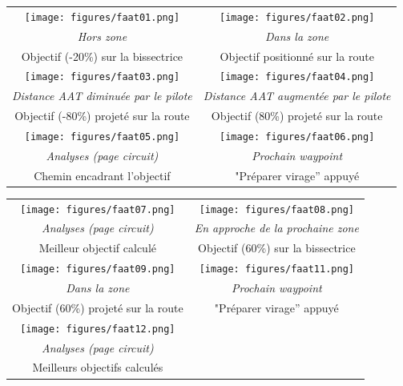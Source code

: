 \begin{maxipage}
\begin{center}
\begin{longtable}{|c|c|}
\toprule
\texttt{[image: figures/faat01.png]} & 
\texttt{[image: figures/faat02.png]} \\
{\em Hors zone} & {\em Dans la zone} \\
Objectif (-20\%) sur la bissectrice & Objectif positionné sur la route \\

\midrule
\texttt{[image: figures/faat03.png]} & 
\texttt{[image: figures/faat04.png]} \\
{\em Distance AAT diminuée par le pilote} & {\em Distance AAT augmentée par le pilote} \\
Objectif (-80\%) projeté sur la route & Objectif (80\%) projeté sur la route \\

\midrule
\texttt{[image: figures/faat05.png]} & 
\texttt{[image: figures/faat06.png]} \\
{\em Analyses (page circuit)} & {\em Prochain waypoint} \\
Chemin encadrant l'objectif  & "Préparer virage'' appuyé \\
\bottomrule
\end{longtable}
\end{center}
\end{maxipage}

\begin{maxipage}
\begin{center}
\begin{longtable}{|c|c|}
\toprule
\texttt{[image: figures/faat07.png]} & 
\texttt{[image: figures/faat08.png]} \\
{\em Analyses (page circuit)} & {\em En approche de la prochaine zone} \\
Meilleur objectif calculé & Objectif (60\%) sur la bissectrice \\

\midrule
\texttt{[image: figures/faat09.png]} & 
\texttt{[image: figures/faat11.png]} \\
{\em Dans la zone} & {\em Prochain waypoint} \\
Objectif (60\%) projeté sur la route & "Préparer virage'' appuyé \\

\midrule
\texttt{[image: figures/faat12.png]} &  \\
{\em Analyses (page circuit)} &  \\
Meilleurs objectifs calculés &  \\

\bottomrule
\end{longtable}
\end{center}
\end{maxipage}


